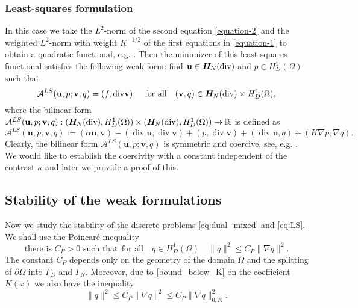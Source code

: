 \documentclass[11pt]{amsart}
\numberwithin{equation}{section}
\theoremstyle{definition}\newtheorem{example}{Example}[section]
\begin{document}
\subsubsection{Least-squares formulation} 
In this case we take the 
$L^2$-norm of the second equation \eqref{equation-2} and the weighted $L^2$-norm
with weight $K^{-1/2}$ of the first equations in \eqref{equation-1}
to obtain a quadratic functional, e.g. \cite{pehlivanov1994least}.
Then the minimizer of this least-squares functional satisfies
the following weak form: find ${{\mathbf u}} \in {{\boldsymbol H}_{\hspace{-0.2mm}N}}({\operatorname{div}})$ and $p \in H^1_D({{\Omega}})$ such that 
\begin{equation}\label{eq:LS}
{{\mathcal A}}^{LS}({{\mathbf u}},p; {{\mathbf v}},q)=(f, {\operatorname{div}} {{\mathbf v}}), 
\quad \mbox{for all}\quad ({{\mathbf v}}, q) \in {{\boldsymbol H}_{\hspace{-0.2mm}N}}({\operatorname{div}}) \times H^1_D({{\Omega}}),
\end{equation}
where the bilinear form 
${{\mathcal A}}^{LS}({{\mathbf u}},p; {{\mathbf v}},q): ({{\boldsymbol H}_{\hspace{-0.2mm}N}}({\operatorname{div}}), H^1_D({{\Omega}}) ) \times ({{\boldsymbol H}_{\hspace{-0.2mm}N}}({\operatorname{div}}), H^1_D({{\Omega}}) ) \to {\mathbb{R}}$
is defined as
\begin{equation}\label{A-form-LS}
{{\mathcal A}}^{LS}({{\mathbf u}},p; {{\mathbf v}},q):=({{\alpha}} {{\mathbf u}}, {{\mathbf v}}) +({\operatorname{div}} {{\mathbf u}}, {\operatorname{div}} {{\mathbf v}}) + (p, {\operatorname{div}} {{\mathbf v}}) + ({\operatorname{div}} {{\mathbf u}}, q) + (K \nabla p, \nabla q).
\end{equation}
Clearly, the bilinear 
form $ {{\mathcal A}}^{LS}({{\mathbf u}},p; {{\mathbf v}},q)$ is symmetric and coercive, see, e.g.
\cite{pehlivanov1994least}.  We would like to establish the coercivity with a 
constant independent of the
contrast $\kappa$ and later we provide a proof of this. 

\subsection{Stability of the weak formulations}
Now we study the stability of the discrete problems \eqref{eq:dual_mixed} and 
\eqref{eq:LS}.  We shall use the Poincar\'e inequality
\begin{equation}\label{Poincare}
\text{there is $C_P>0$ such that} ~~\mbox{for all}\quad 
q \in H^1_D(\Omega) \quad
\|q\|^2 \le C_P \| \nabla q\|^2. 
\end{equation}
The constant $C_P$ depends only on the geometry of the domain
$\Omega$ and the splitting of $\partial \Omega$ into $\Gamma_D$ and 
$\Gamma_N$. Moreover, due to \eqref{bound_below_K} on the
coefficient $K(x)$ we also have the inequality
$$
\|q\|^2 \le C_P \| \nabla q\|^2 \le 
C_P \|\nabla q\|^2_{0,K}.
$$
\end{document}
